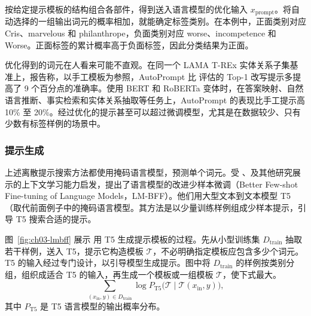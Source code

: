 
按给定提示模板的结构组合各部件，得到送入语言模型的优化输入 $x_{\mathrm{prompt}}$。将自动选择的一组输出词元的概率相加，就能确定标签类别。在本例中，正面类别对应 Cris、marvelous 和 philanthrope，负面类别对应 worse、incompetence 和 Worse。正面标签的累计概率高于负面标签，因此分类结果为正面。

\begin{keypoint}
优化得到的词元在人看来可能不直观。在同一个 LAMA T-REx 实体关系子集基准上，报告称，以手工模板为参照，AutoPrompt 比 评估的 Top-1 改写提示多提高了 9 个百分点的准确率。使用 BERT 和 RoBERTa 变体时，在答案映射、自然语言推断、事实检索和实体关系抽取等任务上，AutoPrompt 的表现比手工提示高 10\% 至 20\%。经过优化的提示甚至可以超过微调模型，尤其是在数据较少、只有少数有标签样例的场景中。
\end{keypoint}

\subsubsection{提示生成}
上述离散提示搜索方法都使用掩码语言模型，预测单个词元。受 、及其他研究展示的上下文学习能力启发，提出了语言模型的改进少样本微调（Better Few-shot Fine-tuning of Language Models，LM-BFF）。他们用大型文本到文本模型 T5（取代前面例子中的掩码语言模型。其方法是以少量训练样例组成少样本提示，引导 T5 搜索合适的提示。

图~\ref{fig:ch03-lmbff} 展示 用 T5 生成提示模板的过程。先从小型训练集 $D_{\mathrm{train}}$ 抽取若干样例，送入 T5，提示它构造模板 $\mathcal{T}$，不必明确指定模板应包含多少个词元。T5 的输入经过专门设计，以引导模型生成提示。图中将 $D_{\mathrm{train}}$ 的样例按类别分组，组织成适合 T5 的输入，再生成一个模板或一组模板 $\mathcal{T}$，使下式最大。
\begin{equation}
\sum_{(x_{\mathrm{in}},y)\in D_{\mathrm{train}}}
\log P_{\mathrm{T5}}\bigl(\mathcal{T}\mid\mathcal{T}(x_{\mathrm{in}},y)\bigr),
\tag{3.11}
\end{equation}
其中 $P_{\mathrm{T5}}$ 是 T5 语言模型的输出概率分布。

